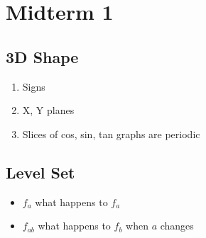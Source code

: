 \section{Midterm 1}

  \subsection{3D Shape}

    \begin{enumerate}
      \item Signs
      \item X, Y planes
      \item Slices of cos, sin, tan graphs are periodic
    \end{enumerate}

  \subsection{Level Set}

    \begin{itemize}
      \item $ f_{a} $ what happens to $ f_{a} $
      \item $ f_{ab} $ what happens to $ f_{b} $ when $ a $ changes
    \end{itemize}